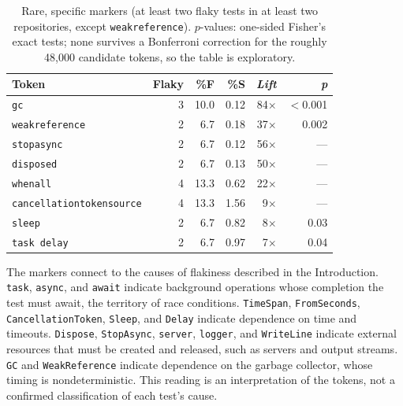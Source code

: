 \begin{table}[!h]
\caption{Rare, specific markers (at least two flaky tests in at least two repositories, except \texttt{weakreference}). $p$-values: one-sided Fisher's exact tests; none survives a Bonferroni correction for the roughly 48,000 candidate tokens, so the table is exploratory.}
\label{tab:marcadores}
\centering
\scriptsize
\setlength{\tabcolsep}{5pt}
\begin{tabular}{@{}lrrrrr@{}}
\toprule
\textbf{Token} & \textbf{Flaky} & \textbf{\%F} & \textbf{\%S} & \textbf{\emph{Lift}} & \textbf{\emph{p}} \\
\midrule
\texttt{gc}                      & 3 & 10.0 & 0.12 & 84$\times$ & $<$0.001 \\
\texttt{weakreference}           & 2 &  6.7 & 0.18 & 37$\times$ & 0.002 \\
\texttt{stopasync}               & 2 &  6.7 & 0.12 & 56$\times$ & --- \\
\texttt{disposed}                & 2 &  6.7 & 0.13 & 50$\times$ & --- \\
\texttt{whenall}                 & 4 & 13.3 & 0.62 & 22$\times$ & --- \\
\texttt{cancellationtokensource} & 4 & 13.3 & 1.56 &  9$\times$ & --- \\
\texttt{sleep}                   & 2 &  6.7 & 0.82 &  8$\times$ & 0.03 \\
\texttt{task delay}              & 2 &  6.7 & 0.97 &  7$\times$ & 0.04 \\
\bottomrule
\end{tabular}
\end{table}

 The markers connect to the causes of flakiness described in the Introduction. \texttt{task}, \texttt{async}, and \texttt{await} indicate background operations whose completion the test must await, the territory of race conditions. \texttt{TimeSpan}, \texttt{FromSeconds}, \texttt{CancellationToken}, \texttt{Sleep}, and \texttt{Delay} indicate dependence on time and timeouts. \texttt{Dispose}, \texttt{StopAsync}, \texttt{server}, \texttt{logger}, and \texttt{WriteLine} indicate external resources that must be created and released, such as servers and output streams. \texttt{GC} and \texttt{WeakReference} indicate dependence on the garbage collector, whose timing is nondeterministic. This reading is an interpretation of the tokens, not a confirmed classification of each test's cause. 

